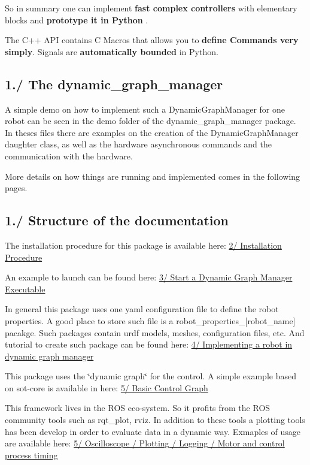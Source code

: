 So in summary one can implement {\bfseries  fast complex controllers } with elementary blocks and {\bfseries  prototype it in Python }.

The C++ A\+PI contains C Macros that allows you to {\bfseries define Commands very simply}. Signals are {\bfseries automatically bounded} in Python.\hypertarget{index_intro_sec_dgm}{}\subsection{1./ The dynamic\+\_\+graph\+\_\+manager}\label{index_intro_sec_dgm}
 A simple demo on how to implement such a Dynamic\+Graph\+Manager for one robot can be seen in the demo folder of the dynamic\+\_\+graph\+\_\+manager package. In theses files there are examples on the creation of the Dynamic\+Graph\+Manager daughter class, as well as the hardware asynchronous commands and the communication with the hardware.

More details on how things are running and implemented comes in the following pages.\hypertarget{index_intro_sec_structure}{}\subsection{1./ Structure of the documentation}\label{index_intro_sec_structure}
The installation procedure for this package is available here\+: \hyperlink{subpage_installation}{2/ Installation Procedure}

An example to launch can be found here\+: \hyperlink{subpage_launch}{3/ Start a Dynamic Graph Manager Executable}

In general this package uses one yaml configuration file to define the robot properties. A good place to store such file is a robot\+\_\+properties\+\_\+\mbox{[}robot\+\_\+name\mbox{]} pacakge. Such packages contain urdf models, meshes, configuration files, etc. And tutorial to create such package can be found here\+: \hyperlink{subpage_robot_properties}{4/ Implementing a robot in dynamic graph manager}

This package uses the \char`\"{}dynamic graph\char`\"{} for the control. A simple example based on sot-\/core is available in here\+: \hyperlink{subpage_basic_control_graph}{5/ Basic Control Graph}

This framework lives in the R\+OS eco-\/system. So it profits from the R\+OS community tools such as rqt\+\_\+plot, rviz. In addition to these tools a plotting tools has been develop in order to evaluate data in a dynamic way. Exmaples of usage are available here\+: \hyperlink{subpage_plot}{5/ Oscilloscope / Plotting / Logging / Motor and control process timing}

